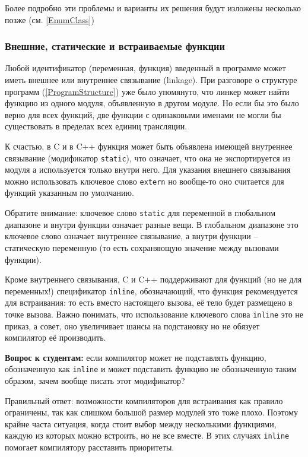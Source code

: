 \documentclass[a4paper,12pt,oneside]{article}
\newif\ifanswers
\begin{document}
Более подробно эти проблемы и варианты их решения будут изложены несколько позже (см. \ref{EnumClass})

\subsubsection{Внешние, статические и встраиваемые функции}\label{Inline}

Любой идентификатор (переменная, функция) введенный в программе может иметь внешнее или внутреннее связывание (linkage). При разговоре о структуре программ (\ref{ProgramStructure}) уже было упомянуто, что линкер может найти функцию из одного модуля, объявленную в другом модуле. Но если бы это было верно для всех функций, две функции с одинаковыми именами не могли бы существовать в пределах всех единиц трансляции. 

К счастью, в C и в C++ функция может быть объявлена имеющей внутреннее связывание (модификатор \lstinline!static!), что означает, что она не экспортируется из модуля а используется только внутри него. Для указания внешнего связывания можно использовать ключевое слово \lstinline!extern! но вообще-то оно считается для функций указанным по умолчанию.

Обратите внимание: ключевое слово \lstinline!static! для переменной в глобальном диапазоне и внутри функции означает разные вещи. В глобальном диапазоне это ключевое слово означает внутреннее связывание, а внутри функции -- статическую переменную (то есть сохраняющую значение между вызовами функции).

Кроме внутреннего связывания, C и C++ поддерживают для функций (но не для переменных!) спецификатор \lstinline!inline!, обозначающий, что функция рекомендуется для встраивания: то есть вместо настоящего вызова, её тело будет размещено в точке вызова. Важно понимать, что использование ключевого слова \lstinline!inline! это не приказ, а совет, оно увеличивает шансы на подстановку но не обязует компилятор её производить.

\textbf{Вопрос к студентам:} если компилятор может не подставлять функцию, обозначенную как \lstinline!inline! и может подставить функцию не обозначенную таким образом, зачем вообще писать этот модификатор?

\ifanswers
Возможный ответ: \lstinline!inline! позволяет определение функции в каждом модуле (но увы это можно парировать тем, что для этого есть \lstinline!static!)
\fi

Правильный ответ: возможности компиляторов для встраивания как правило ограничены, так как слишком большой размер модулей это тоже плохо. Поэтому крайне часта ситуация, когда стоит выбор между несколькими функциями, каждую из которых можно встроить, но не все вместе. В этих случаях \lstinline!inline! помогает компилятору расставить приоритеты.
\end{document}
